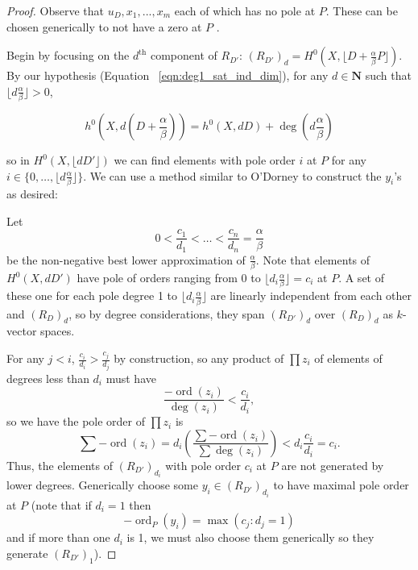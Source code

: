 \documentclass{amsart}
\theoremstyle{plain}
\theoremstyle{definition}
\theoremstyle{remark}
\numberwithin{equation}{section}
\DeclareMathOperator{\ord}{ord}
\begin{document}
\begin{proof}
Observe that $u_D,x_1,...,x_m$ each of which has no pole at $P$.
These can be chosen generically to not have a zero at $P$ .

Begin by focusing on the $d^{\text{th}}$ component of $R_{D'}$: $(R_
{D'})_d = H^0(X, \lfloor D + \frac{\alpha}{\beta} P \rfloor)$. By
our hypothesis (Equation ~\ref{eqn:deg1_sat_ind_dim}), for any $d
\in \mathbf{N}$ such that $\lfloor d \frac{ \alpha}{\beta} \rfloor > 0$,

\[
	h^0 (X, d(D+\frac{\alpha}{\beta})) = h^0(X, dD) + \deg(d\frac{\alpha}{\beta})
\]

\noindent
so in $H^0 (X, \lfloor dD' \rfloor)$ we can find elements with pole
order $i$ at $P$ for any $i \in \{0, \ldots, \lfloor d \frac{\alpha}{
\beta} \rfloor \}$. We can use a method similar to O'Dorney to
construct the $y_i$'s as desired: 

Let 
\[
	0 < \frac{c_1}{d_1} < \ldots < \frac{c_n}{d_n} = \frac{\alpha}{
\beta}
\] 
be the non-negative best lower approximation of $\frac{
\alpha}{\beta}$.  Note that elements of $H^0(X,dD')$ have pole of
orders ranging from 0 to $\lfloor d_i \frac{\alpha}{\beta}\rfloor =
c_i $ at $P$.  A set of these one for each pole degree 1 to $\lfloor
d_i \frac{\alpha}{\beta} \rfloor$ are linearly independent from
each other and $(R_D)_d$, so by degree considerations, they span
$(R_{D'})_d$ over $(R_D)_d$ as $k$-vector spaces. 

For any $j < i$, $\frac{c_i}{d_i} > \frac{c_j}{d_j}$
by construction, so any product of $\prod z_i$ of elements of
degrees less than $d_i$ must have 
\[
	\frac{-\ord(z_i)}{\deg(z_i)} < \frac{c_i}{d _i},
\]
so we have the pole order of $\prod z_i$ is 
\[
	\sum -\ord(z_i) = d_i(\frac{\sum -\ord( z_i)}{\sum \deg( z_i)}) < d_i\frac{c_i}{d_i} = c_i .
\] 
Thus, the elements of $(R_{D'})_{d_i}$ with pole order $c_i$ at $P$ are not generated by 
lower degrees.  
Generically choose some $y_i \in(R_{
D'})_{d_i}$ to have maximal pole order at $P$ (note that if $d_i=1$ then 
\[
	-\ord_P(y_i)= \max(c_j:d_j=1)
\]
and if more than one $d_i$ is 1, we
must also choose them generically so they generate $(R_{D'})_1$).


\end{proof}
\end{document}
